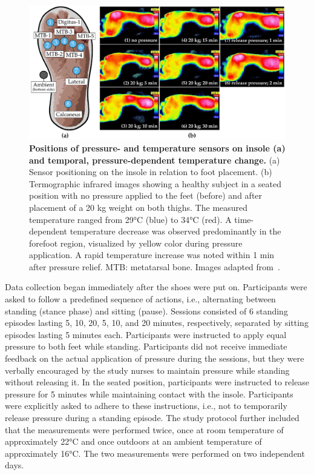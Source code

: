 \documentclass[
  oneside]{book}
\begin{document}
\begin{figure}[h]
\includegraphics[width=1\linewidth]{figures/02-df-infrared-sole-sensor-positions} \caption[fig.scap]{\textbf{Positions of pressure- and temperature sensors on insole (a) and temporal, pressure-dependent temperature change.} (a) Sensor positioning on the insole in relation to foot placement. (b) Termographic infrared images showing a healthy subject in a seated position with no pressure applied to the feet (before) and after placement of a 20 kg weight on both thighs. The measured temperature ranged from 29°C (blue) to 34°C (red). A time-dependent temperature decrease was observed predominantly in the forefoot region, visualized by yellow color during pressure application. A rapid temperature increase was noted within 1 min after pressure relief. MTB: metatarsal bone. Images adapted from~\autocite{Niemann:EBioMedicine2020}.}\label{fig:02-df-infrared-sole-sensor-positions-plot}
\end{figure}

Data collection began immediately after the shoes were put on.
Participants were asked to follow a predefined sequence of actions, i.e., alternating between standing (stance phase) and sitting (pause).
Sessions consisted of 6 standing episodes lasting 5, 10, 20, 5, 10, and 20 minutes, respectively, separated by sitting episodes lasting 5 minutes each.
Participants were instructed to apply equal pressure to both feet while standing.
Participants did not receive immediate feedback on the actual application of pressure during the sessions, but they were verbally encouraged by the study nurses to maintain pressure while standing without releasing it.
In the seated position, participants were instructed to release pressure for 5 minutes while maintaining contact with the insole.
Participants were explicitly asked to adhere to these instructions, i.e., not to temporarily release pressure during a standing episode.
The study protocol further included that the measurements were performed twice, once at room temperature of approximately 22°C and once outdoors at an ambient temperature of approximately 16°C.
The two measurements were performed on two independent days.
\end{document}
